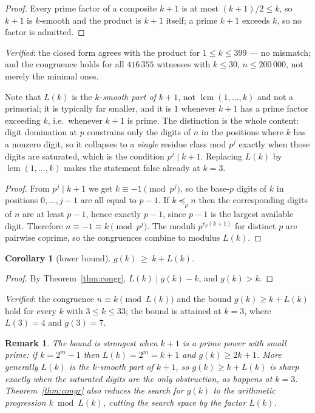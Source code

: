 \documentclass[11pt]{article}
\newtheorem{corollary}[theorem]{Corollary}
\newtheorem{remark}[theorem]{Remark}
\begin{document}
\begin{proof}
Every prime factor of a composite $k+1$ is at most $(k+1)/2\le k$, so $k+1$ is $k$-smooth and
the product is $k+1$ itself; a prime $k+1$ exceeds $k$, so no factor is admitted.
\end{proof}

\emph{Verified}: the closed form agrees with the product for $1\le k\le399$ --- no mismatch;
and the congruence holds for all $416\,355$ witnesses with $k\le30$, $n\le200\,000$, not merely
the minimal ones.

Note that $L(k)$ is the \emph{$k$-smooth part of $k+1$}, not $\operatorname{lcm}(1,\dots,k)$
and not a primorial; it is typically far smaller, and it is $1$ whenever $k+1$ has a prime
factor exceeding $k$, i.e.\ whenever $k+1$ is prime.  The distinction is the whole content:
digit domination at $p$ constrains only the digits of $n$ in the positions where $k$ has a
nonzero digit, so it collapses to a \emph{single} residue class mod $p^{j}$ exactly when
those digits are saturated, which is the condition $p^{j}\mid k+1$.  Replacing $L(k)$ by
$\operatorname{lcm}(1,\dots,k)$ makes the statement false already at $k=3$.

\begin{proof}
From $p^{j}\mid k+1$ we get $k\equiv-1\pmod{p^{j}}$, so the base-$p$ digits of $k$ in
positions $0,\dots,j-1$ are all equal to $p-1$.  If $k\preceq_pn$ then the corresponding
digits of $n$ are at least $p-1$, hence exactly $p-1$, since $p-1$ is the largest available
digit.  Therefore $n\equiv-1\equiv k\pmod{p^{j}}$.  The moduli $p^{v_p(k+1)}$ for distinct
$p$ are pairwise coprime, so the congruences combine to modulus $L(k)$.
\end{proof}

\begin{corollary}[lower bound]\label{cor:lower}
$g(k)\ \ge\ k+L(k)$.
\end{corollary}

\begin{proof}
By Theorem~\ref{thm:congr}, $L(k)\mid g(k)-k$, and $g(k)>k$.
\end{proof}

\emph{Verified}: the congruence $n\equiv k\pmod{L(k)}$ and the bound $g(k)\ge k+L(k)$ hold
for every $k$ with $3\le k\le33$; the bound is attained at $k=3$, where $L(3)=4$ and
$g(3)=7$.

\begin{remark}
The bound is strongest when $k+1$ is a prime power with small prime: if $k=2^{m}-1$ then
$L(k)=2^{m}=k+1$ and $g(k)\ge2k+1$.  More generally $L(k)$ is the $k$-smooth part of $k+1$,
so $g(k)\ge k+L(k)$ is sharp exactly when the saturated digits are the only obstruction, as
happens at $k=3$.  Theorem~\ref{thm:congr} also reduces the search for $g(k)$ to the
arithmetic progression $k\bmod L(k)$, cutting the search space by the factor $L(k)$.
\end{remark}
\end{document}
